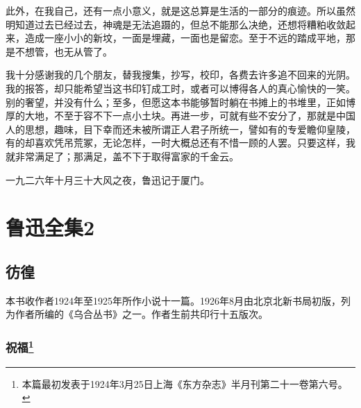 \par 此外，在我自己，还有一点小意义，就是这总算是生活的一部分的痕迹。所以虽然明知道过去已经过去，神魂是无法追蹑的，但总不能那么决绝，还想将糟粕收敛起来，造成一座小小的新坟，一面是埋藏，一面也是留恋。至于不远的踏成平地，那是不想管，也无从管了。
\par 我十分感谢我的几个朋友，替我搜集，抄写，校印，各费去许多追不回来的光阴。我的报答，却只能希望当这书印钉成工时，或者可以博得各人的真心愉快的一笑。别的奢望，并没有什么；至多，但愿这本书能够暂时躺在书摊上的书堆里，正如博厚的大地，不至于容不下一点小土块。再进一步，可就有些不安分了，那就是中国人的思想，趣味，目下幸而还未被所谓正人君子所统一，譬如有的专爱瞻仰皇陵，有的却喜欢凭吊荒冢，无论怎样，一时大概总还有不惜一顾的人罢。只要这样，我就非常满足了；那满足，盖不下于取得富家的千金云。
\par 一九二六年十月三十大风之夜，鲁迅记于厦门。






\section{鲁迅全集2}


\subsection{彷徨}

本书收作者1924年至1925年所作小说十一篇。1926年8月由北京北新书局初版，列为作者所编的《乌合丛书》之一。作者生前共印行十五版次。


\subsubsection*{祝福\footnote{本篇最初发表于1924年3月25日上海《东方杂志》半月刊第二十一卷第六号。}}

